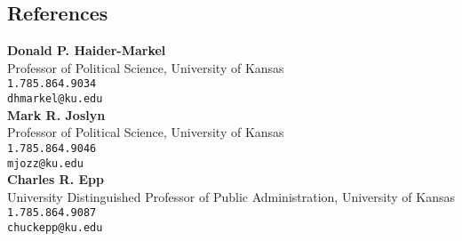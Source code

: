 \documentclass[margin,line,pifont,palatino,courier]{res}
\begin{document}
\begin{resume}






\section{\sc References}

{\bf Donald P. Haider-Markel} \\
Professor of Political Science, University of Kansas \\
\verb+1.785.864.9034+\\
\texttt{dhmarkel@ku.edu}\\

{\bf Mark R. Joslyn} \\
Professor of Political Science, University of Kansas \\
\verb+1.785.864.9046+\\
\texttt{mjozz@ku.edu}\\


{\bf Charles R. Epp} \\
University Distinguished Professor of Public Administration, University of Kansas \\
\verb+1.785.864.9087+\\
\texttt{chuckepp@ku.edu}

\end{resume}
\end{document}
